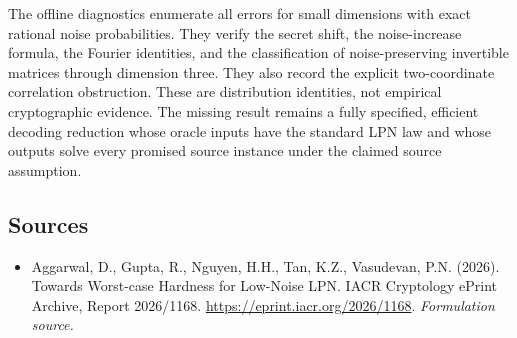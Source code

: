 \documentclass[11pt]{article}
\begin{document}
The offline diagnostics enumerate all errors for small dimensions with exact rational noise probabilities. They verify the secret shift, the noise-increase formula, the Fourier identities, and the classification of noise-preserving invertible matrices through dimension three. They also record the explicit two-coordinate correlation obstruction. These are distribution identities, not empirical cryptographic evidence. The missing result remains a fully specified, efficient decoding reduction whose oracle inputs have the standard LPN law and whose outputs solve every promised source instance under the claimed source assumption.

\subsection{Sources}
\begin{itemize}
\item[S1]Aggarwal, D., Gupta, R., Nguyen, H.H., Tan, K.Z., Vasudevan, P.N. (2026). Towards Worst-case Hardness for Low-Noise LPN. IACR Cryptology ePrint Archive, Report 2026/1168.
\url{https://eprint.iacr.org/2026/1168}.
\textit{Formulation source.}
\end{itemize}
\end{document}
